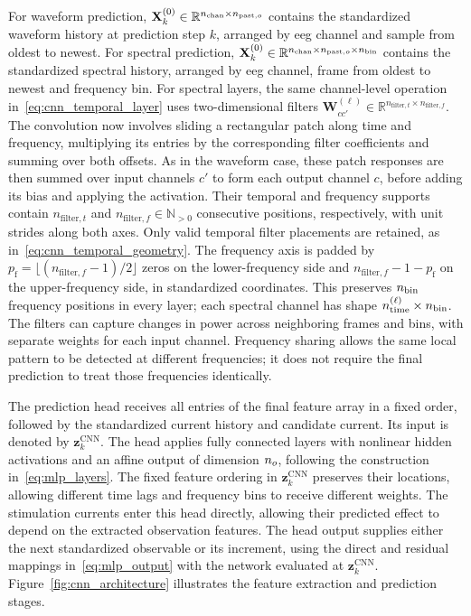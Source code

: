 For waveform prediction, $\mathbf X^{(0)}_k\in\mathbb R^{n_{\mathrm{chan}}{}\times n_{\mathrm{past},o}}$ contains the standardized waveform history at prediction step $k$, arranged by \ac{eeg} channel and sample from oldest to newest.
For spectral prediction, $\mathbf X^{(0)}_k\in\mathbb R^{n_{\mathrm{chan}}{}\times n_{\mathrm{past},o}\times n_{\mathrm{bin}}{}}$ contains the standardized spectral history, arranged by \ac{eeg} channel, frame from oldest to newest and frequency bin.
For spectral layers, the same channel-level operation in~\eqref{eq:cnn_temporal_layer} uses two-dimensional filters $\mathbf W_{cc'}^{(\ell)}\in\mathbb R^{n_{\mathrm{filter},t}\times n_{\mathrm{filter},f}}$.
The convolution now involves sliding a rectangular patch along time and frequency, multiplying its entries by the corresponding filter coefficients and summing over both offsets.
As in the waveform case, these patch responses are then summed over input channels $c'$ to form each output channel $c$, before adding its bias and applying the activation.
Their temporal and frequency supports contain $n_{\mathrm{filter},t}$ and $n_{\mathrm{filter},f}\in\mathbb N_{>0}$ consecutive positions, respectively, with unit strides along both axes.
Only valid temporal filter placements are retained, as in~\eqref{eq:cnn_temporal_geometry}.
The frequency axis is padded by $p_{\mathrm f}=\lfloor(n_{\mathrm{filter},f}-1)/2\rfloor$ zeros on the lower-frequency side and $n_{\mathrm{filter},f}-1-p_{\mathrm f}$ on the upper-frequency side, in standardized coordinates.
This preserves $n_{\mathrm{bin}}{}$ frequency positions in every layer; each spectral channel has shape $n_{\mathrm{time}}^{(\ell)}\times n_{\mathrm{bin}}{}$.
The filters can capture changes in power across neighboring frames and bins, with separate weights for each input channel.
Frequency sharing allows the same local pattern to be detected at different frequencies; it does not require the final prediction to treat those frequencies identically.

The prediction head receives all entries of the final feature array in a fixed order, followed by the standardized current history and candidate current.
Its input is denoted by $\mathbf z_k^{\mathrm{CNN}}$.
The head applies fully connected layers with nonlinear hidden activations and an affine output of dimension $n_{o}$, following the construction in~\eqref{eq:mlp_layers}.
The fixed feature ordering in $\mathbf{z}_k^{\mathrm{CNN}}$ preserves their locations, allowing different time lags and frequency bins to receive different weights.
The stimulation currents enter this head directly, allowing their predicted effect to depend on the extracted observation features.
The head output supplies either the next standardized observable or its increment, using the direct and residual mappings in~\eqref{eq:mlp_output} with the network evaluated at $\mathbf{z}_k^{\mathrm{CNN}}$.
Figure~\ref{fig:cnn_architecture} illustrates the feature extraction and prediction stages.

